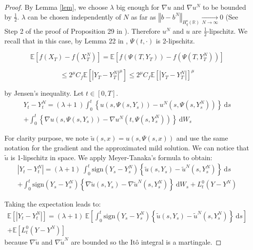 \documentclass{article}[12pt]
\newcommand{\norme}[1]{\left\Vert #1\right\Vert}
\newcommand{\R}{\mathbb{R}}
\newcommand{\E}{\mathbb{E}}
\newcommand{\di}{\mathrm{d}}
\begin{document}
\begin{proof}
    By Lemma \ref{lem}, we choose $\lambda$ big enough for $\nabla u$ and $\nabla u^N$ to be bounded by $\frac{1}{2}$. $\lambda$ can be chosen independently of $N$ as far as $\norme{b - b^N}_{H_q^s(\R)} \underset{N\rightarrow\infty}{\longrightarrow} 0$ (See Step 2 of the proof of Proposition 29 in \cite{Fla-Iss-Rus-2017}). Therefore $u^N$ and $u$ are $\frac{1}{2}$-lipschitz. We recall that in this case, by Lemma 22 in \cite{Fla-Iss-Rus-2017}, $\Psi(t,\cdot)$ is 2-lipschitz.
    
    \begin{equation*}
    \E\left[f\left(X_T\right)-f\left(X_T^N\right)\right] = \E\left[f\left(\Psi\left(T,Y_T\right)\right)-f\left(\Psi\left(T,Y_T^N\right)\right)\right]
    \end{equation*}
    
    \begin{equation*}
    \leq 2^\mu C_f  \E\left[\left|Y_T-Y_T^N\right|^\mu\right] \leq 2^\mu C_f  \E\left[\left|Y_T-Y_T^N\right|\right]^\mu
    \end{equation*}
    
    by Jensen's inequality. Let $t\in[0,T]$.
    \begin{multline*}
    Y_t-Y_t^N = (\lambda + 1\ )\int_0^t\left\{u\left(s,\Psi\left(s,Y_s\right)\right)-u^N\left(s,\Psi\left(s,Y_s^N\right)\right)\right\}\ \di s\\ + \int_0^t\left\{\nabla u\left(s,\Psi\left(s,Y_s\right)\right)-\nabla u^N\left(t,\Psi\left(s,Y_s^N\right)\right)\right\}\ \di W_s
    \end{multline*}
    
    For clarity purpose, we note $\tilde{u}\left(s,x\right) = u\left(s,\Psi\left(s,x\right)\right)$ and use the same notation for the gradient and the approximated mild solution. We can notice that $\tilde{u}$ is 1-lipschitz in space. We apply Meyer-Tanaka's formula to obtain:
    \begin{multline*}
    \left|Y_t-Y_t^N\right| = (\lambda + 1)\ \int_0^t\mathrm{sign}(Y_s-Y_s^N)\left\{\tilde{u}\left(s,Y_s\right)-\tilde{u}^N\left(s,Y_s^N\right)\right\}\ \di s\\ + \int_0^t\mathrm{sign}(Y_s-Y_s^N)\left\{\nabla\tilde{u}\left(s,Y_s\right)-\nabla\tilde{u}^N\left(s,Y_s^N\right)\right\}\ \di W_s + L_t^0(Y-Y^N)
    \end{multline*}
    
    Taking the expectation leads to:
    \begin{multline*}
    \E\left[\left|Y_t-Y_t^N\right|\right] = (\lambda + 1)\ \E\left[\int_0^t\mathrm{sign}(Y_s-Y_s^N)\left\{\tilde{u}\left(s,Y_s\right)-\tilde{u}^N\left(s,Y_s^N\right)\right\}\ \di s\right]\\ + \E \left[L_t^0(Y-Y^N)\right]
    \end{multline*}
    because $\nabla\tilde{u}$ and $\nabla\tilde{u}^N$ are bounded so the Itô integral is a martingale.
    

\end{proof}
\end{document}
